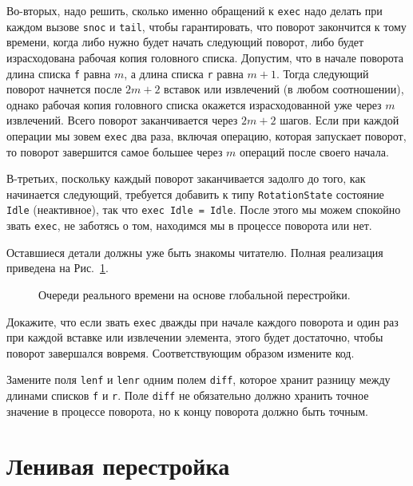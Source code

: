 Во-вторых, надо решить, сколько именно обращений к \lstinline!exec!
надо делать при каждом вызове \lstinline!snoc! и \lstinline!tail!,
чтобы гарантировать, что поворот закончится к тому времени, когда либо
нужно будет начать следующий поворот, либо будет израсходована рабочая
копия головного списка.  Допустим, что в начале поворота длина списка
\lstinline!f! равна $m$, а длина списка \lstinline!r! равна
$m+1$. Тогда следующий поворот начнется после $2m+2$ вставок или
извлечений (в любом соотношении), однако рабочая копия головного
списка окажется израсходованной уже через $m$ извлечений. Всего
поворот заканчивается через $2m+2$ шагов. Если при каждой операции мы
зовем \lstinline!exec! два раза, включая операцию, которая запускает
поворот, то поворот завершится самое большее через $m$ операций после
своего начала.

В-третьих, поскольку каждый поворот заканчивается задолго до того, как
начинается следующий, требуется добавить к типу
\lstinline!RotationState! состояние \lstinline!Idle! (неактивное), так
что \lstinline!exec Idle = Idle!. После этого мы можем спокойно звать
\lstinline!exec!, не заботясь о том, находимся мы в процессе поворота
или нет.

Оставшиеся детали должны уже быть знакомы читателю. Полная реализация
приведена на Рис.~\ref{fig:8.1}.

\begin{figure}
  \centering
  
  \caption{Очереди реального времени на основе глобальной перестройки.}
  \label{fig:8.1}
\end{figure}

\begin{exercise}\label{ex:8.1}
  Докажите, что если звать \lstinline!exec! дважды при начале
  каждого поворота и один раз при каждой вставке или извлечении
  элемента, этого будет достаточно, чтобы поворот завершался
  вовремя. Соответствующим образом измените код.
\end{exercise}

\begin{exercise}\label{ex:8.2}
  Замените поля \lstinline!lenf! и \lstinline!lenr! одним полем
  \lstinline!diff!, которое хранит разницу между длинами списков
  \lstinline!f! и \lstinline!r!. Поле \lstinline!diff! не обязательно
  должно хранить точное значение в процессе поворота, но к концу поворота
  должно быть точным.
\end{exercise}

\section{Ленивая перестройка}
\label{sc:8.3}

